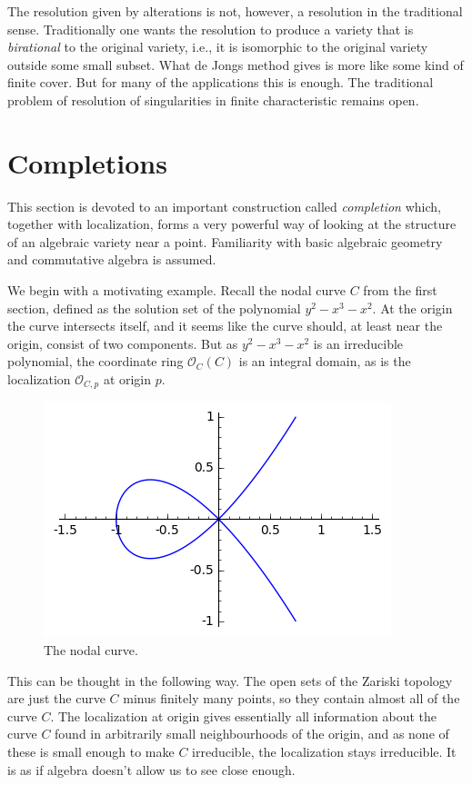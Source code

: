 \documentclass[12pt,a4paper,leqno]{article}
\newcommand{\OO}{\mathcal{O}}
\theoremstyle{plain}
\theoremstyle{definition}
\theoremstyle{remark}
\begin{document}
The resolution given by alterations is not, however, a resolution in the traditional sense. Traditionally one wants the resolution to produce a variety that is \emph{birational} to the original variety, i.e., it is isomorphic to the original variety outside some small subset. What de Jongs method gives is more like some kind of finite cover. But for many of the applications this is enough. The traditional problem of resolution of singularities in finite characteristic remains open.


\section{Completions}

This section is devoted to an important construction called \emph{completion} which, together with localization, forms a very powerful way of looking at the structure of an algebraic variety near a point. Familiarity with basic algebraic geometry and commutative algebra is assumed.

We begin with a motivating example. Recall the nodal curve $C$ from the first section, defined as the solution set of the polynomial $y^2 - x^3 - x^2$. At the origin the curve intersects itself, and it seems like the curve should, at least near the origin, consist of two components. But as $y^2 - x^3 - x^2$ is an irreducible polynomial, the coordinate ring $\OO_C (C)$ is an integral domain, as is the localization $\OO_{C,p}$ at origin $p$.

\begin{figure}\label{node2}
\begin{center}
\includegraphics{pics/node.png}
\caption{The nodal curve.}
\end{center}
\end{figure}

This can be thought in the following way. The open sets of the Zariski topology are just the curve $C$ minus finitely many points, so they contain almost all of the curve $C$. The localization at origin gives essentially all information about the curve $C$ found in arbitrarily small neighbourhoods of the origin, and as none of these is small enough to make $C$ irreducible, the localization stays irreducible. It is as if algebra doesn't allow us to see close enough.
\end{document}

